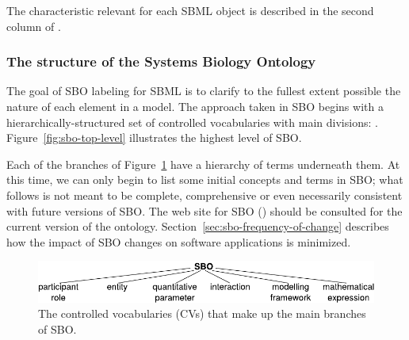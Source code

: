 The characteristic relevant for each SBML object is described in the second column of \label{tab:sboterm-availability}.

\subsubsection{The structure of the Systems Biology Ontology}

The goal of SBO labeling for SBML is to clarify to the fullest
extent possible the nature of each element in a model.  The
approach taken in SBO begins with a hierarchically-structured set
of controlled vocabularies with  main divisions: .
Figure~\vref{fig:sbo-top-level} illustrates the highest level of
SBO.

Each of the  branches of Figure~\ref{fig:sbo-top-level} have a
hierarchy of terms underneath them.  At this time, we can only
begin to list some initial concepts and terms in SBO; what follows
is not meant to be complete, comprehensive or even necessarily
consistent with future versions of SBO.  The web site for SBO
(\sboref) should be consulted for the current version of the
ontology.  Section~\ref{sec:sbo-frequency-of-change} describes how
the impact of SBO changes on software applications is minimized.

\begin{figure}[tbh]
  \vspace*{1ex}
  \centering
  \includegraphics[scale = 0.8]{figs/sbo-top-level}
  \vspace*{1ex}
  \caption{The  controlled vocabularies (CVs) that
      make up the main branches of SBO.}
  \label{fig:sbo-top-level}
\end{figure}

